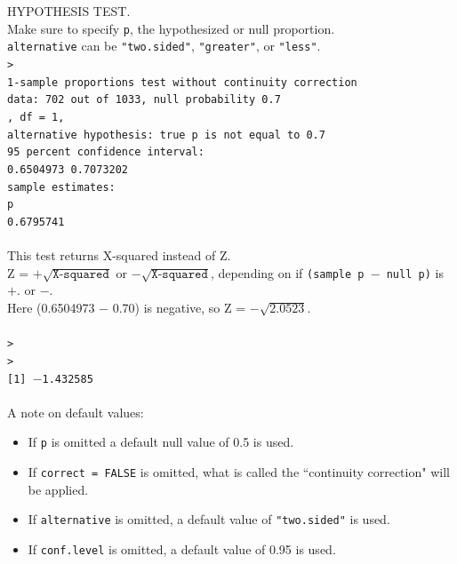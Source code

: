 \noindent HYPOTHESIS TEST.\\
\noindent Make sure to specify \texttt{p}, the hypothesized or null proportion. \\
 \texttt{alternative} can be \texttt{"two.sided"}, \texttt{"greater"}, or \texttt{"less"}.\\

\noindent \texttt{> \\
	1-sample proportions test without continuity correction\\
data:  702 out of 1033, null probability 0.7\\
, df = 1, \\
alternative hypothesis: true p is not equal to 0.7\\
95 percent confidence interval:\\
 0.6504973 0.7073202\\
sample estimates:\\
        p \\
0.6795741\\ 
}\\ 
This test returns X-squared instead of Z.   
\\Z = $+\sqrt{\texttt{X-squared}}$ or $-\sqrt{\texttt{X-squared}}$, depending on if \mbox{\texttt{(sample p $-$ null p)}} is $+$. or $-$. 
\\ Here (0.6504973 $-$ 0.70) is negative, so Z = $-\sqrt{2.0523}$.\\ \\
\texttt{> }\\
\texttt{> }\\
\texttt{[1] $-$1.432585}\\ \\

\noindent A note on default values:
\begin{itemize}
\setlength{\itemsep}{0mm}
\item If \texttt{p} is omitted a default null value of 0.5 is used.  
\item If \texttt{correct = FALSE} is omitted, what is called the ``continuity correction" will be applied.
\item If \texttt{alternative} is omitted, a default value of \texttt{"two.sided"} is used.  
\item If \texttt{conf.level} is omitted, a default value of 0.95 is used.
\end{itemize}

